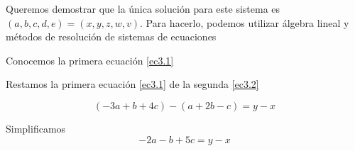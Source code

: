 \begin{enumerate}
      Queremos demostrar que la única solución para este sistema es $(a,b,c,d,e) = (x,y,z,w,v)$. Para
      hacerlo, podemos utilizar álgebra lineal y métodos de resolución de sistemas de ecuaciones

      Conocemos la primera ecuación \eqref{ec3.1}
            
      Restamos la primera ecuación \eqref{ec3.1} de la segunda \eqref{ec3.2}

      \begin{equation*}
            (-3a + b + 4c) - (a + 2b -c) = y -x
      \end{equation*}
      
      Simplificamos 
      \begin{equation*}
            -2a - b + 5c = y - x
      \end{equation*}
      

\end{enumerate}
